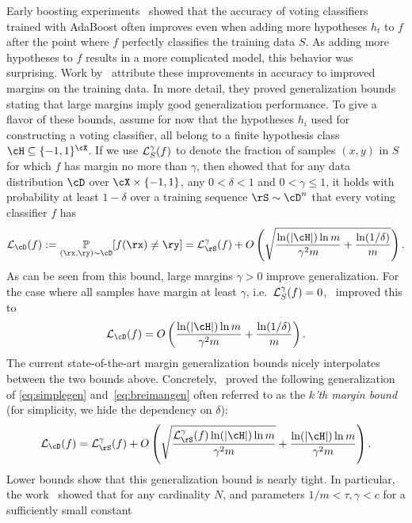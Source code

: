 Early boosting experiments~\cite{Schapire19981651} showed that the accuracy of voting
classifiers trained with AdaBoost often improves even when adding
more hypotheses $h_t$ to $f$ after the point where $f$ perfectly classifies the training
data $S$. As adding more hypotheses to $f$ results in a more
complicated model, this behavior was surprising.  Work
by~\cite{Schapire19981651} attribute these improvements in accuracy to improved
margins on the training data. In more detail, they proved
generalization bounds stating that large margins imply good
generalization performance. To give a flavor of these bounds, assume
for now that the hypotheses $h_i$ used for constructing a voting
classifier, all belong to a finite hypothesis class $\cH \subseteq
\{-1,1\}^{\cX}$. If we use $\operatorname{\mathcal{L}}^\gamma_{S}(f)$ to denote the
fraction of samples $(x,y)$ in $S$ for which $f$ has margin no more
than $\gamma$, then \cite{Schapire19981651} showed that for any data distribution
$\cD$ over $\cX \times \{-1,1\}$, any $0 < \delta < 1$ and $0 < \gamma
\leq 1$, it holds
with probability at least $1-\delta$ over a training sequence $\rS \sim
\cD^n$ that every voting classifier $f$ has
\begin{align}
 \ls_{\cD}(f):= \Pr_{(\rx, \ry) \sim \cD}[f(\rx) \neq \ry] =
  \ls^\gamma_\rS(f) + 
 O\left( \sqrt{\frac{\ln(|\cH|) \ln m}{\gamma^2 m} + \frac{\ln(1/\delta)}{m}}\right).\label{eq:simplegen}
\end{align}
As can be seen from this bound, large margins $\gamma > 0$ improve
generalization. For the case where all samples have margin at least
$\gamma$, i.e.\ $\operatorname{\mathcal{L}}_S^\gamma(f)=0$,~\cite{10.1162/089976699300016106} improved this to
\begin{align}
 \ls_{\cD}(f) = 
 O\left( \frac{\ln(|\cH|) \ln m}{\gamma^2 m} + \frac{\ln(1/\delta)}{m}\right).\label{eq:breimangen}
\end{align}
The current state-of-the-art margin generalization bounds nicely
interpolates between the two bounds above. Concretely,~\cite{GAO20131} proved the following generalization
of \cref{eq:simplegen} and~\cref{eq:breimangen} often referred to as the \emph{$k$'th margin
  bound} (for simplicity, we hide the dependency on $\delta$):
\begin{align}
  \ls_{\cD}(f) = \ls_{\rS}^\gamma(f) +
  O\left(\sqrt{\frac{\ls_{\rS}^\gamma(f) \ln(|\cH|) \ln m}{\gamma^2
  m}} +\frac{\ln(|\cH|) \ln m}{\gamma^2 m}\right). \label{eq:refinedgen}
\end{align}
Lower bounds show that this generalization bound is nearly
tight. In particular, the work~\cite{DBLP:conf/nips/GronlundKL20} showed that for any cardinality $N$, and parameters $1/m <\tau, \gamma < c$ for a sufficiently small constant
